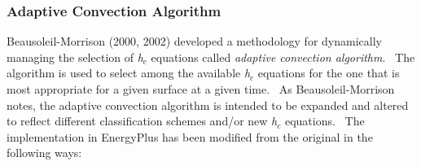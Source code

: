 \subsubsection{Adaptive Convection Algorithm}\label{adaptive-convection-algorithm}

Beausoleil-Morrison (2000, 2002) developed a methodology for dynamically managing the selection of \emph{h\(_{c}\)} equations called \emph{adaptive convection algorithm}.~ The algorithm is used to select among the available \emph{h\(_{c}\)} equations for the one that is most appropriate for a given surface at a given time.~ As Beausoleil-Morrison notes, the adaptive convection algorithm is intended to be expanded and altered to reflect different classification schemes and/or new \emph{h\(_{c}\)} equations.~ The implementation in EnergyPlus has been modified from the original in the following ways:


